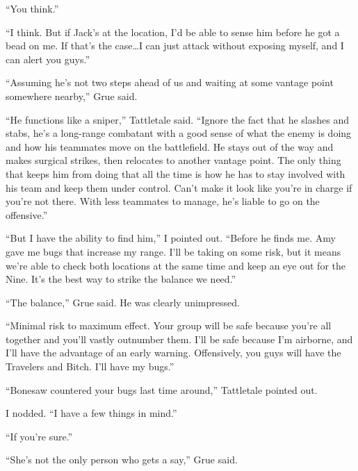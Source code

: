``You think.''



``I think.  But if Jack's at the location, I'd be able to sense him before he got a bead on me.  If that's the case\ldots I can just attack without exposing myself, and I can alert you guys.''



``Assuming he's not two steps ahead of us and waiting at some vantage point somewhere nearby,'' Grue said.



``He functions like a sniper,'' Tattletale said.  ``Ignore the fact that he slashes and stabs, he's a long-range combatant with a good sense of what the enemy is doing and how his teammates move on the battlefield.  He stays out of the way and makes surgical strikes, then relocates to another vantage point.  The only thing that keeps him from doing that all the time is how he has to stay involved with his team and keep them under control.  Can't make it look like you're in charge if you're not there.  With less teammates to manage, he's liable to go on the offensive.''



``But I have the ability to find him,'' I pointed out.  ``Before he finds me.  Amy gave me bugs that increase my range.  I'll be taking on some risk, but it means we're able to check both locations at the same time and keep an eye out for the Nine.  It's the best way to strike the balance we need.''



``The balance,'' Grue said.  He was clearly unimpressed.



``Minimal risk to maximum effect.  Your group will be safe because you're all together and you'll vastly outnumber them.  I'll be safe because I'm airborne, and I'll have the advantage of an early warning.  Offensively, you guys will have the Travelers and Bitch.  I'll have my bugs.''



``Bonesaw countered your bugs last time around,'' Tattletale pointed out.



I nodded.  ``I have a few things in mind.''



``If you're sure.''



``She's not the only person who gets a say,'' Grue said.



